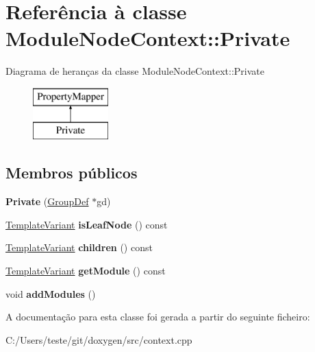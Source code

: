 \hypertarget{class_module_node_context_1_1_private}{\section{Referência à classe Module\-Node\-Context\-:\-:Private}
\label{class_module_node_context_1_1_private}
}
Diagrama de heranças da classe Module\-Node\-Context\-:\-:Private\begin{figure}[H]
\begin{center}
\leavevmode
\includegraphics[height=2.000000cm]{class_module_node_context_1_1_private}
\end{center}
\end{figure}
\subsection*{Membros públicos}
\begin{DoxyCompactItemize}
\item 
\hypertarget{class_module_node_context_1_1_private_a1fdeacdc54c86ef95bc37346c3bb4c18}{{\bfseries Private} (\hyperlink{class_group_def}{Group\-Def} $\ast$gd)}\label{class_module_node_context_1_1_private_a1fdeacdc54c86ef95bc37346c3bb4c18}

\item 
\hypertarget{class_module_node_context_1_1_private_a294b828ee5cfccceb76c68a2a2c94965}{\hyperlink{class_template_variant}{Template\-Variant} {\bfseries is\-Leaf\-Node} () const }\label{class_module_node_context_1_1_private_a294b828ee5cfccceb76c68a2a2c94965}

\item 
\hypertarget{class_module_node_context_1_1_private_aca10906ad6f957c2696e917548979f46}{\hyperlink{class_template_variant}{Template\-Variant} {\bfseries children} () const }\label{class_module_node_context_1_1_private_aca10906ad6f957c2696e917548979f46}

\item 
\hypertarget{class_module_node_context_1_1_private_ac9192d87f0559ecd2237328a9762ade6}{\hyperlink{class_template_variant}{Template\-Variant} {\bfseries get\-Module} () const }\label{class_module_node_context_1_1_private_ac9192d87f0559ecd2237328a9762ade6}

\item 
\hypertarget{class_module_node_context_1_1_private_a9abf08eeec74ec57e85b25a2b23d0de4}{void {\bfseries add\-Modules} ()}\label{class_module_node_context_1_1_private_a9abf08eeec74ec57e85b25a2b23d0de4}

\end{DoxyCompactItemize}


A documentação para esta classe foi gerada a partir do seguinte ficheiro\-:\begin{DoxyCompactItemize}
\item 
C\-:/\-Users/teste/git/doxygen/src/context.\-cpp\end{DoxyCompactItemize}
